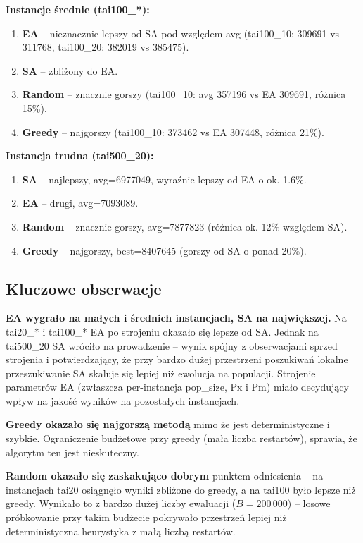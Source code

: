 \documentclass[11pt,a4paper]{article}
\begin{document}
\textbf{Instancje średnie (tai100\_*):}
\begin{enumerate}
    \item \textbf{EA} -- nieznacznie lepszy od SA pod względem avg (tai100\_10: 309691 vs 311768, tai100\_20: 382019 vs 385475).
    \item \textbf{SA} -- zbliżony do EA.
    \item \textbf{Random} -- znacznie gorszy (tai100\_10: avg 357196 vs EA 309691, różnica 15\%).
    \item \textbf{Greedy} -- najgorszy (tai100\_10: 373462 vs EA 307448, różnica 21\%).
\end{enumerate}

\textbf{Instancja trudna (tai500\_20):}
\begin{enumerate}
    \item \textbf{SA} -- najlepszy, avg=6977049, wyraźnie lepszy od EA o ok. 1.6\%.
    \item \textbf{EA} -- drugi, avg=7093089.
    \item \textbf{Random} -- znacznie gorszy, avg=7877823 (różnica ok. 12\% względem SA).
    \item \textbf{Greedy} -- najgorszy, best=8407645 (gorszy od SA o ponad 20\%).
\end{enumerate}

\subsection{Kluczowe obserwacje}

\textbf{EA wygrało na małych i średnich instancjach, SA na największej.} Na tai20\_* i tai100\_* EA po strojeniu okazało się lepsze od SA. Jednak na tai500\_20 SA wróciło na prowadzenie -- wynik spójny z obserwacjami sprzed strojenia i potwierdzający, że przy bardzo dużej przestrzeni poszukiwań lokalne przeszukiwanie SA skaluje się lepiej niż ewolucja na populacji. Strojenie parametrów EA (zwłaszcza per-instancja pop\_size, Px i Pm) miało decydujący wpływ na jakość wyników na pozostałych instancjach.

\textbf{Greedy okazało się najgorszą metodą} mimo że jest deterministyczne i szybkie. Ograniczenie budżetowe przy greedy (mała liczba restartów), sprawia, że algorytm ten jest nieskuteczny.

\textbf{Random okazało się zaskakująco dobrym} punktem odniesienia -- na instancjach tai20 osiągnęło wyniki zbliżone do greedy, a na tai100 było lepsze niż greedy. Wynikało to z bardzo dużej liczby ewaluacji ($B = 200\,000$) -- losowe próbkowanie przy takim budżecie pokrywało przestrzeń lepiej niż deterministyczna heurystyka z małą liczbą restartów.
\end{document}
